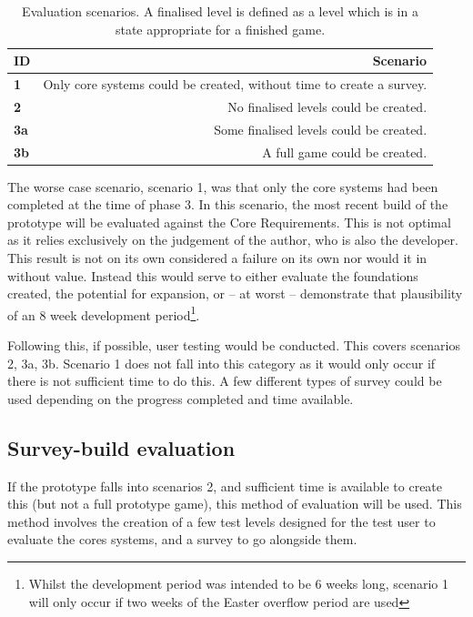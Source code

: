 \begin{table}[h]
    \centering
    \begin{tabular}{lr}\toprule
        \textbf{ID} & Scenario  \\\midrule
        \textbf{1} & Only core systems could be created, without time to create a survey. \\
        \textbf{2} & No finalised levels could be created. \\ 
        \textbf{3a} & Some finalised levels could be created. \\
        \textbf{3b} & A full game could be created. \\
    \bottomrule\end{tabular}
    \caption[Evaluation scenarios]{Evaluation scenarios. A finalised level is defined as a level which is in a state appropriate for a finished game.}
    \label{tab:evaluation_scenarios}
\end{table}

The worse case scenario, scenario 1, was that only the core systems had been completed at the time of phase 3. In this scenario, the most recent build of the prototype will be evaluated against the Core Requirements. This is not optimal as it relies exclusively on the judgement of the author, who is also the developer. This result is not on its own considered a failure on its own nor would it in without value. Instead this would serve to either evaluate the foundations created, the potential for expansion, or -- at worst -- demonstrate that plausibility of an 8 week development period\footnote{Whilst the development period was intended to be 6 weeks long, scenario 1 will only occur if two weeks of the Easter overflow period are used}.

Following this, if possible, user testing would be conducted. This covers scenarios 2, 3a, 3b. Scenario 1 does not fall into this category as it would only occur if there is not sufficient time to do this. A few different types of survey could be used depending on the progress completed and time available.

\subsection{Survey-build evaluation}

If the prototype falls into scenarios 2, and sufficient time is available to create this (but not a full prototype game), this method of evaluation will be used. This method involves the creation of a few test levels designed for the test user to evaluate the cores systems, and a survey to go alongside them.

